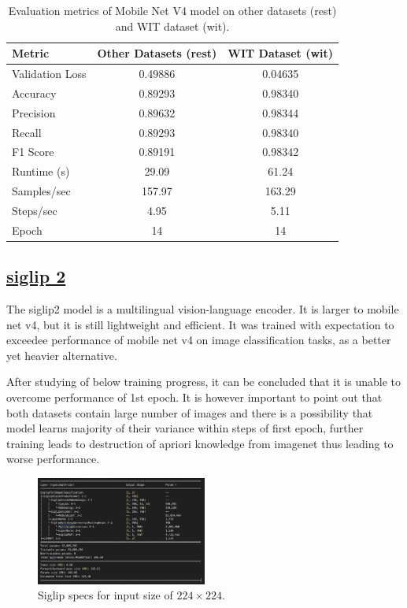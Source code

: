 \documentclass[a4paper]{article}
\begin{document}
\begin{table}[H]
    \centering
    \caption{Evaluation metrics of Mobile Net V4 model on other datasets (rest) and WIT dataset (wit).}
    \label{tab:mobile_net_wit_eval}
    \begin{tabular}{lcc}
        \toprule
        \textbf{Metric} & \textbf{Other Datasets (rest)} & \textbf{WIT Dataset (wit)} \\
        \midrule
        Validation Loss      & 0.49886   & 0.04635 \\
        Accuracy             & 0.89293   & 0.98340 \\
        Precision            & 0.89632   & 0.98344 \\
        Recall               & 0.89293   & 0.98340 \\
        F1 Score             & 0.89191   & 0.98342 \\
        Runtime (s)          & 29.09     & 61.24 \\
        Samples/sec          & 157.97    & 163.29 \\
        Steps/sec            & 4.95      & 5.11 \\
        Epoch                & 14        & 14 \\
        \bottomrule
    \end{tabular}
\end{table}

\subsection{\href{https://huggingface.co/blog/siglip2}{siglip 2}}

The siglip2 model is a multilingual vision-language encoder. It is larger to mobile net v4, but it is still lightweight and efficient. It was trained with expectation to exceedee performance of mobile net v4 on image classification tasks, as a better yet heavier alternative.

After studying of below training progress, it can be concluded that it is unable to overcome performance of 1st epoch. It is however important to point out that both datasets contain large number of images and there is a possibility that model learns majority of their variance within steps of first epoch, further training leads to destruction of apriori knowledge from imagenet thus leading to worse performance.

\begin{figure}[H]
    \centering
    \includegraphics[width=0.5\textwidth]{images/siglip.png}
    \caption{Siglip specs for input size of $224\times224$.}
\end{figure}
\end{document}
